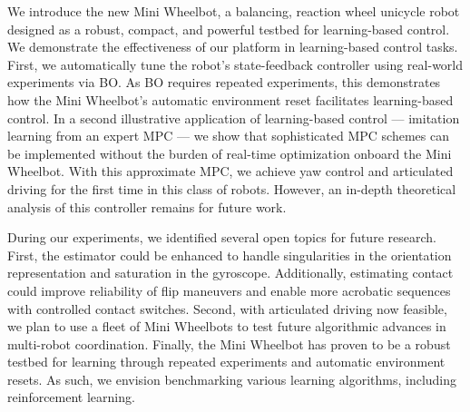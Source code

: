 We introduce the new Mini Wheelbot, a balancing, reaction wheel unicycle robot designed as a robust, compact, and powerful testbed for learning-based control.
We demonstrate the effectiveness of our platform in learning-based control tasks. First, we automatically tune the robot's state-feedback controller using real-world experiments via BO.
As BO requires repeated experiments, this demonstrates how the Mini Wheelbot's automatic environment reset facilitates learning-based control.
In a second illustrative application of learning-based control — imitation learning from an expert MPC — we show that sophisticated MPC schemes can be implemented without the burden of real-time optimization onboard the Mini Wheelbot.
With this approximate MPC, we achieve yaw control and articulated driving for the first time in this class of robots.
However, an in-depth theoretical analysis of this controller remains for future work.

During our experiments, we identified several open topics for future research.
First, the estimator could be enhanced to handle singularities in the orientation representation and saturation in the gyroscope.
Additionally, estimating contact could improve reliability of flip maneuvers and enable more acrobatic sequences with controlled contact switches.
Second, with articulated driving now feasible, we plan to use a fleet of Mini Wheelbots to test future algorithmic advances in multi-robot coordination. 
Finally, the Mini Wheelbot has proven to be a robust testbed for learning through repeated experiments and automatic environment resets.
As such, we envision benchmarking various learning algorithms, including reinforcement learning.
